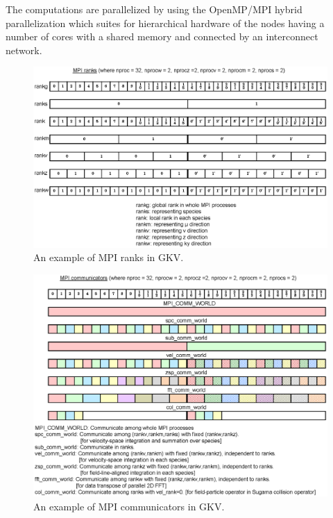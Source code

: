The computations are parallelized by using the OpenMP/MPI hybrid parallelization which suites for hierarchical hardware of the nodes having a number of cores with a shared memory and connected by an interconnect network.

\begin{figure}[tb!]
  \centering
  \includegraphics[scale=0.8]{./discretization/140627MPI_ranks_communicators_1.eps}
  \caption{An example of MPI ranks in GKV.}
  \label{fig:MPI_ranks_communicators_1}
\end{figure}
\begin{figure}[tb!]
  \centering
  \includegraphics[scale=0.8]{./discretization/140627MPI_ranks_communicators_2.eps}
  \caption{An example of MPI communicators in GKV.}
  \label{fig:MPI_ranks_communicators_2}
\end{figure}
